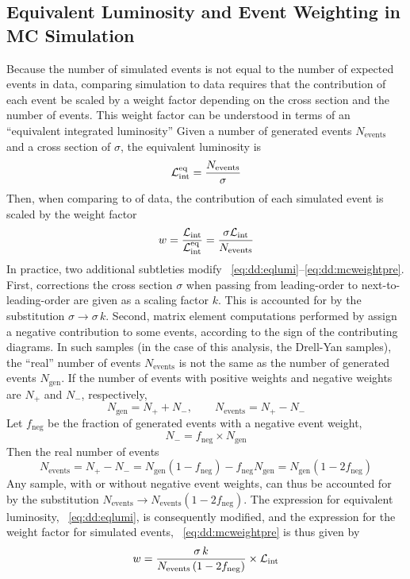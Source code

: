 \subsection{Equivalent Luminosity and Event Weighting in MC Simulation}
\label{sec:dd:EqLumi}
Because the number of simulated events is not equal to the number of expected events in data, comparing simulation to data requires that the contribution of each event be scaled by a weight factor depending on the cross section and the number of events.
This weight factor can be understood in terms of an ``equivalent integrated luminosity''
Given a number of generated events $N_\text{events}$ and a cross section of $\sigma$, the equivalent luminosity is
\begin{equation}
  \mathcal{L}_\mathrm{int}^\text{eq} = \frac{N_\text{events}}{\sigma}
  \label{eq:dd:eqlumi}
\end{equation}
Then, when comparing to \intlumi of data, the contribution of each simulated event is scaled by the weight factor
\begin{equation}
  w = \frac{\mathcal{L}_\mathrm{int}}{\mathcal{L}_\mathrm{int}^\text{eq}} = \frac{\sigma\mathcal{L}_\mathrm{int}}{N_\text{events}}
  \label{eq:dd:mcweightpre}
\end{equation}
In practice, two additional subtleties modify \Eqs~\ref{eq:dd:eqlumi}--\ref{eq:dd:mcweightpre}.
First, corrections the cross section $\sigma$ when passing from leading-order to next-to-leading-order are given as a scaling factor $k$.
This is accounted for by the substitution $\sigma \to \sigma \, k$.
Second, matrix element computations performed by \MGvATNLO assign a negative contribution to some events, according to the sign of the contributing diagrams.
In such samples (in the case of this analysis, the Drell-Yan samples), the ``real'' number of events $N_\text{events}$ is not the same as the number of generated events $N_\text{gen}$.
If the number of events with positive weights and negative weights are $N_+$ and $N_-$, respectively,
$$N_{\text{gen}} = N_+ + N_-,\quad\quad N_\text{events} = N_+ - N_-$$
Let $f_\text{neg}$ be the fraction of generated events with a negative event weight, \ie $$N_- = f_\text{neg} \times N_\text{gen}$$
Then the real number of events
\begin{equation}
  N_\text{events} = N_+ - N_- = N_\text{gen}\left(1 - f_\text{neg}\right) - f_\text{neg}N_\text{gen} = N_\text{gen}\left( 1-2f_\text{neg} \right)
  \label{eq:dd:neventsfrac}
\end{equation}
Any sample, with or without negative event weights, can thus be accounted for by the substitution $N_\text{events} \to N_\text{events}\left( 1-2f_\text{neg} \right)$.
The expression for equivalent luminosity, \Eq~\ref{eq:dd:eqlumi}, is consequently modified, and the expression for the weight factor for simulated events, \Eq~\ref{eq:dd:mcweightpre} is thus given by
\begin{equation}
  w = \frac{\sigma\,k}{N_\text{events}\left( 1-2f_\text{neg} \right)} \times \mathcal{L}_\mathrm{int}
  \label{eq:dd:mcweight}
\end{equation}

